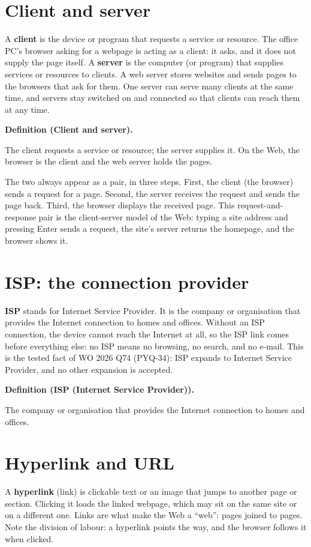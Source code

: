 \documentclass[11pt]{article}
\newenvironment{definitionbox}[1]{%
  \par\noindent\textbf{Definition (#1).}\ \itshape
}{\par\vspace{0.3em}}
\begin{document}
\section{Client and server}
A \textbf{client} is the device or program that requests a service or
resource. The office PC's browser asking for a webpage is acting as a
client: it asks, and it does not supply the page itself. A \textbf{server}
is the computer (or program) that supplies services or resources to clients.
A web server stores websites and sends pages to the browsers that ask for
them. One server can serve many clients at the same time, and servers stay
switched on and connected so that clients can reach them at any time.

\begin{definitionbox}{Client and server}
The client requests a service or resource; the server supplies it. On the
Web, the browser is the client and the web server holds the pages.
\end{definitionbox}

The two always appear as a pair, in three steps. First, the client (the
browser) sends a request for a page. Second, the server receives the request
and sends the page back. Third, the browser displays the received page. This
request-and-response pair is the client-server model of the Web: typing a
site address and pressing Enter sends a request, the site's server returns
the homepage, and the browser shows it.

\section{ISP: the connection provider}
\textbf{ISP} stands for Internet Service Provider. It is the company or
organisation that provides the Internet connection to homes and offices.
Without an ISP connection, the device cannot reach the Internet at all, so
the ISP link comes before everything else: no ISP means no browsing, no
search, and no e-mail. This is the tested fact of WO 2026 Q74 (PYQ-34): ISP
expands to Internet Service Provider, and no other expansion is accepted.

\begin{definitionbox}{ISP (Internet Service Provider)}
The company or organisation that provides the Internet connection to homes
and offices.
\end{definitionbox}

\section{Hyperlink and URL}
A \textbf{hyperlink} (link) is clickable text or an image that jumps to
another page or section. Clicking it loads the linked webpage, which may sit
on the same site or on a different one. Links are what make the Web a
``web'': pages joined to pages. Note the division of labour: a hyperlink
points the way, and the browser follows it when clicked.
\end{document}
